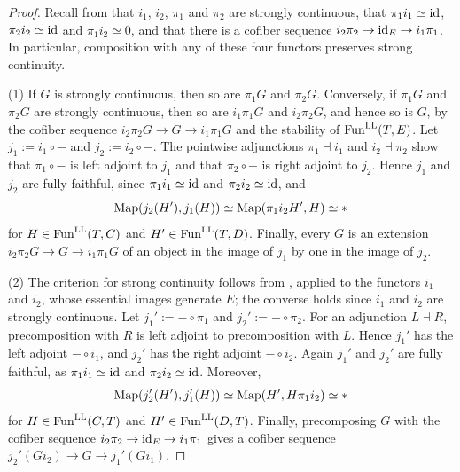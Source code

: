 	\begin{proof}
		Recall from  that $i_1$, $i_2$, $\pi_1$ and $\pi_2$ are strongly continuous, that $\pi_1i_1 \simeq \operatorname{id}$, $\pi_2i_2 \simeq \operatorname{id}$ and $\pi_1i_2 \simeq 0$, and that there is a cofiber sequence $i_2\pi_2 \to \operatorname{id}_E \to i_1\pi_1$. In particular, composition with any of these four functors preserves strong continuity.

		(1) If $G$ is strongly continuous, then so are $\pi_1G$ and $\pi_2G$. Conversely, if $\pi_1G$ and $\pi_2G$ are strongly continuous, then so are $i_1\pi_1G$ and $i_2\pi_2G$, and hence so is $G$, by the cofiber sequence $i_2\pi_2G \to G \to i_1\pi_1G$ and the stability of $\operatorname{Fun}^{\mathrm{LL}}(T,E)$. Let $j_1 := i_1 \circ -$ and $j_2 := i_2 \circ -$. The pointwise adjunctions $\pi_1 \dashv i_1$ and $i_2 \dashv \pi_2$ show that $\pi_1 \circ -$ is left adjoint to $j_1$ and that $\pi_2 \circ -$ is right adjoint to $j_2$. Hence $j_1$ and $j_2$ are fully faithful, since $\pi_1i_1 \simeq \operatorname{id}$ and $\pi_2i_2 \simeq \operatorname{id}$, and
		\[
			\operatorname{Map}(j_2(H'),j_1(H)) \simeq \operatorname{Map}(\pi_1i_2H',H) \simeq *
		\]
		for $H \in \operatorname{Fun}^{\mathrm{LL}}(T,C)$ and $H' \in \operatorname{Fun}^{\mathrm{LL}}(T,D)$. Finally, every $G$ is an extension $i_2\pi_2G \to G \to i_1\pi_1G$ of an object in the image of $j_1$ by one in the image of $j_2$.

		(2) The criterion for strong continuity follows from , applied to the functors $i_1$ and $i_2$, whose essential images generate $E$; the converse holds since $i_1$ and $i_2$ are strongly continuous. Let $j_1' := - \circ \pi_1$ and $j_2' := - \circ \pi_2$. For an adjunction $L \dashv R$, precomposition with $R$ is left adjoint to precomposition with $L$. Hence $j_1'$ has the left adjoint $- \circ i_1$, and $j_2'$ has the right adjoint $- \circ i_2$. Again $j_1'$ and $j_2'$ are fully faithful, as $\pi_1i_1 \simeq \operatorname{id}$ and $\pi_2i_2 \simeq \operatorname{id}$. Moreover,
		\[
			\operatorname{Map}(j_2'(H'),j_1'(H)) \simeq \operatorname{Map}(H',H\pi_1i_2) \simeq *
		\]
		for $H \in \operatorname{Fun}^{\mathrm{LL}}(C,T)$ and $H' \in \operatorname{Fun}^{\mathrm{LL}}(D,T)$. Finally, precomposing $G$ with the cofiber sequence $i_2\pi_2 \to \operatorname{id}_E \to i_1\pi_1$ gives a cofiber sequence $j_2'(Gi_2) \to G \to j_1'(Gi_1)$.
	\end{proof}



